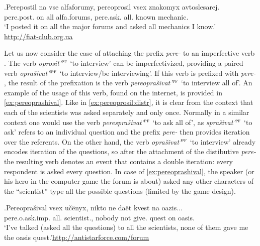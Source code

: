 \exg.\label{ex:pereoprosil:distr}Perepostil na vse alfaforumy, pereoprosil vsex znakomyx avtoslesarej.\\ 
pere.post. on all {alfa.forums}, pere.ask. all. known mechanic.\\
\trans `I posted it on all the major forums and asked all mechanics I know.'\\\hbox{}\hfill\hbox{\url{http://fiat-club.org.ua}}

Let us now consider the case of attaching the prefix \textit{pere-}   to an imperfective verb . The verb \textit{oprosit'}$^{\textsc{pf}}$ `to interview' can be imperfectivized, providing a paired verb \textit{opra\v{s}ivat'}$^{\textsc{ipf}}$ `to interview/be interviewing'. If this verb is prefixed with \textit{pere-} , the result of the prefixation  is the verb \textit{pereopra\v{s}ivat'}$^{\textsc{pf}}$ `to interview all of'. An example of the usage of this verb, found on the internet, is provided in \ref{ex:pereoprashival}. Like in \ref{ex:pereoprosil:distr}, it is clear from the context   that each of the scientists was asked separately and only once. Normally in a similar context   one would use the verb \textit{perespra\v{s}ivat'}$^{\textsc{pf}}$ `to ask all of', as \textit{spra\v{s}ivat'}$^{\textsc{pf}}$ `to ask' refers to an individual question and the prefix \textit{pere-}   then provides iteration over the referents. On the other hand, the verb \textit{opra\v{s}ivat'}$^{\textsc{pf}}$ `to interview' already encodes iteration of the questions, so after the attachment of the distibutive \textit{pere-}   the resulting verb denotes an event that contains a double iteration: every respondent is asked every question. In case of \ref{ex:pereoprashival}, the speaker (or his hero in the computer game the forum is about) asked any other characters of the ``scientist'' type all the possible questions (limited by the game design).

\exg.\label{ex:pereoprashival}Pereopra\v{s}ival vsex u\v{c}\"{e}nyx, nikto ne da\"{e}t kvest na oazis...\\
pere.o.ask.imp. all. scientist., nobody not give. quest on oasis.\\
\trans `I've talked (asked all the questions) to all the scientists, none of them gave me the oasis quest.'\hbox{}\hfill\hbox{\url{http://antistarforce.com/forum}}

